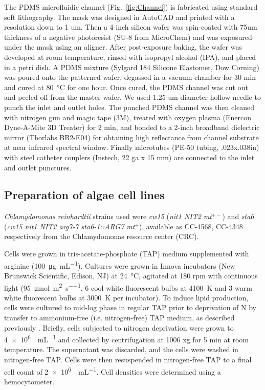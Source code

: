 \documentclass[aps,pra,reprint,groupedaddress]{revtex4-1}
\begin{document}
The PDMS microfluidic channel (Fig.~\ref{fig:Channel}) is fabricated using standard soft lithography. The mask was designed in AutoCAD and printed with a resolution down to 1 um. Then a 4-inch silicon wafer was spin-coated with 75um thickness of a negative photoresist (SU-8 from MicroChem) and was exposured under the mask using an aligner. After post-exposure baking, the wafer was developed at room temperature, rinsed with isopropyl alcohol (IPA), and placed in a petri dish.  A PDMS mixture (Sylgard 184 Silicone Elastomer, Dow Corning) was poured onto the patterned wafer, degassed in a vacuum chamber for 30 min and cured at \SI{80}{\degreeCelsius} for one hour. Once cured, the PDMS channel was cut out and peeled off from the master wafer. We used 1.25 um diameter hollow needle to punch the inlet and outlet holes. 
The punched PDMS channel was then cleaned with nitrogen gun and magic tape (3M), treated with oxygen plasma (Enercon Dyne-A-Mite 3D Treater) for 2 min, and bonded to a 2-inch broadband dielectric mirror (Thorlabs BB2-E04) for obtaining high reflectance from channel substrate at near infrared spectral window. Finally microtubes (PE-50 tubing, .023x.038in) with steel catheter couplers (Instech, 22 ga x 15 mm) are connected to the inlet and outlet punctures.


\subsection{Preparation of algae cell lines}

\textit{Chlamydomonas reinhardtii} strains used were \textit{cw15} (\textit{nit1 NIT2 mt$^{+-}$}) and \textit{sta6} (\textit{cw15 nit1 NIT2 arg7-7 sta6-1::ARG7 mt$^+$}), available as CC-4568, CC-4348 respectively from the Chlamydomonas resource center (CRC)\cite{minnesota2015chlamydomonas}.

Cells were grown in tris-acetate-phosphate (TAP) medium supplemented with arginine (\SI{100}{\micro\gram\per\milli\liter}). Cultures were grown in Innova incubators (New Brunswick Scientific, Edison, NJ) at \SI{24}{\degreeCelsius}, agitated at 180 rpm with continuous light (\SI{95}{\micro\mole\per\square\meter\per\second}, 6 cool white fluorescent bulbs at \SI{4100}{\kelvin} and 3 warm white fluorescent bulbs at \SI{3000}{\kelvin} per incubator). To induce lipid production, cells were cultured to mid-log phase in regular TAP prior to deprivation of N by transfer to ammonium-free (i.e. nitrogen-free) TAP medium, as described previously \cite{blaby2013systems}. Briefly, cells subjected to nitrogen deprivation were grown to \SI{4e6}{\cells\per\milli\liter} and collected by centrifugation at 1006 xg for 5 min at room temperature. The supernatant was discarded, and the cells were washed in nitrogen-free TAP. Cells were then resuspended in nitrogen-free TAP to a final cell count of \SI{2e6}{\cells\per\milli\liter}. Cell densities were determined using a hemocytometer.



\end{document}

